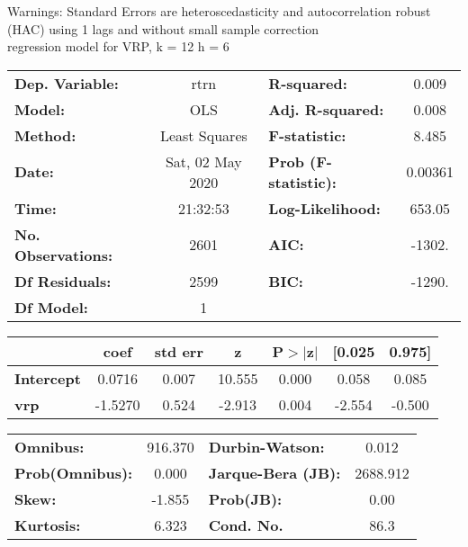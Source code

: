Warnings: \newline
 [1] Standard Errors are heteroscedasticity and autocorrelation robust (HAC) using 1 lags and without small sample correction\\ 

regression model for VRP, k = 12 h = 6\begin{center}
\begin{tabular}{lclc}
\toprule
\textbf{Dep. Variable:}    &       rtrn       & \textbf{  R-squared:         } &     0.009   \\
\textbf{Model:}            &       OLS        & \textbf{  Adj. R-squared:    } &     0.008   \\
\textbf{Method:}           &  Least Squares   & \textbf{  F-statistic:       } &     8.485   \\
\textbf{Date:}             & Sat, 02 May 2020 & \textbf{  Prob (F-statistic):} &  0.00361    \\
\textbf{Time:}             &     21:32:53     & \textbf{  Log-Likelihood:    } &    653.05   \\
\textbf{No. Observations:} &        2601      & \textbf{  AIC:               } &    -1302.   \\
\textbf{Df Residuals:}     &        2599      & \textbf{  BIC:               } &    -1290.   \\
\textbf{Df Model:}         &           1      & \textbf{                     } &             \\
\bottomrule
\end{tabular}
\begin{tabular}{lcccccc}
                   & \textbf{coef} & \textbf{std err} & \textbf{z} & \textbf{P$> |$z$|$} & \textbf{[0.025} & \textbf{0.975]}  \\
\midrule
\textbf{Intercept} &       0.0716  &        0.007     &    10.555  &         0.000        &        0.058    &        0.085     \\
\textbf{vrp}       &      -1.5270  &        0.524     &    -2.913  &         0.004        &       -2.554    &       -0.500     \\
\bottomrule
\end{tabular}
\begin{tabular}{lclc}
\textbf{Omnibus:}       & 916.370 & \textbf{  Durbin-Watson:     } &    0.012  \\
\textbf{Prob(Omnibus):} &   0.000 & \textbf{  Jarque-Bera (JB):  } & 2688.912  \\
\textbf{Skew:}          &  -1.855 & \textbf{  Prob(JB):          } &     0.00  \\
\textbf{Kurtosis:}      &   6.323 & \textbf{  Cond. No.          } &     86.3  \\
\bottomrule
\end{tabular}
\end{center}

